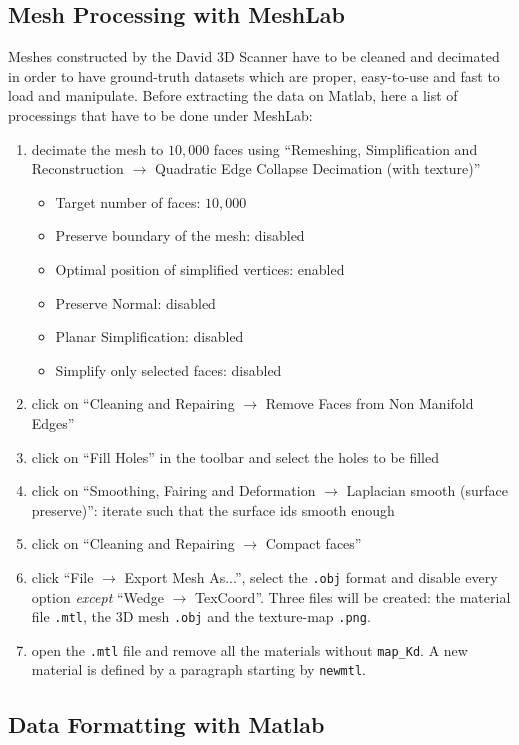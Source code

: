 \documentclass[11pt]{article}
\begin{document}
\subsection{Mesh Processing with MeshLab}

Meshes constructed by the David 3D Scanner have to be cleaned and decimated in order to have ground-truth datasets which are proper, easy-to-use and fast to load and manipulate.
Before extracting the data on Matlab, here a list of processings that have to be done under MeshLab:
\begin{enumerate}
\item decimate the mesh to $10,000$ faces using ``Remeshing, Simplification and Reconstruction $\rightarrow$ Quadratic Edge Collapse Decimation (with texture)''
\begin{itemize}
\item Target number of faces: $10,000$
\item Preserve boundary of the mesh: disabled
\item Optimal position of simplified vertices: enabled
\item Preserve Normal: disabled
\item Planar Simplification: disabled
\item Simplify only selected faces: disabled
\end{itemize}
\item click on ``Cleaning and Repairing $\rightarrow$ Remove Faces from Non Manifold Edges''
\item click on ``Fill Holes'' in the toolbar and select the holes to be filled
\item click on ``Smoothing, Fairing and Deformation $\rightarrow$ Laplacian smooth (surface preserve)'': iterate such that the surface ids smooth enough
\item click on ``Cleaning and Repairing $\rightarrow$ Compact faces''
\item click ``File $\rightarrow$ Export Mesh As...'', select the \texttt{.obj} format and disable every option \emph{except} ``Wedge $\rightarrow$ TexCoord''. Three files will be created: the material file \texttt{.mtl}, the 3D mesh \texttt{.obj} and the texture-map \texttt{.png}.
\item open the \texttt{.mtl} file and remove all the materials without \texttt{map\_Kd}. A new material is defined by a paragraph starting by \texttt{newmtl}.
\end{enumerate}


\subsection{Data Formatting with Matlab}
\end{document}
